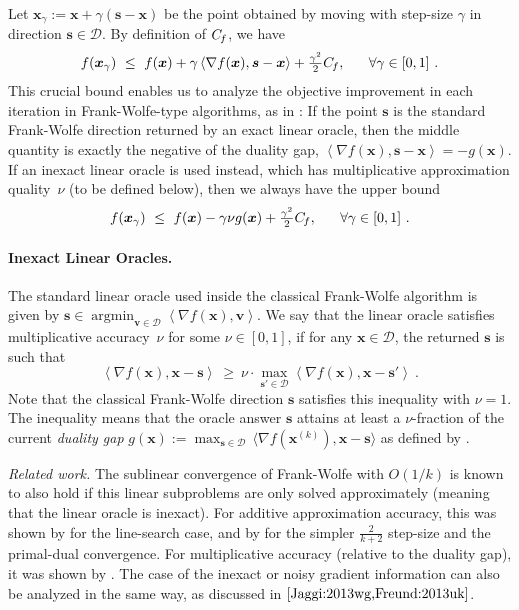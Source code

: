 \documentclass{article} %
\DeclareMathOperator*{\argmin}{\arg\min}
\newcommand{\domain}{\mathcal{D}}
\newcommand{\stepsize}{\gamma}
\newcommand{\Cf}{C_{\hspace{-0.08em}f}}
\newcommand{\x}{\bm{x}}
\newcommand{\s}{\bm{s}}
\newcommand{\vv}{\bm{v}} %
\newcommand{\mapprox}{\nu} %
\newcommand{\0}{\mathbf{0}} %
\begin{document}
Let $\x_\stepsize :=  \x + \stepsize (\s-\x)$ be the point obtained by moving with step-size $\stepsize$ in direction $\s\in\domain$. By definition of $\Cf$, we have
\[\textstyle
%
f(\x_\stepsize) ~\leq~ f(\x) + \stepsize \left\langle  \nabla f(\x), \s-\x \right\rangle + \frac{\stepsize^2}{2} \Cf,~~~~~\forall \stepsize \in [0,1] \ .
\]
This crucial bound enables us to analyze the objective improvement in each iteration in Frank-Wolfe-type algorithms, as in \cite{Jaggi:2013wg}:
If the point $\s$ is the standard Frank-Wolfe direction returned by an exact linear oracle, then the middle quantity is exactly the negative of the duality gap, $\left\langle  \nabla f(\x), \s-\x \right\rangle = -g(\x)$.
If an inexact linear oracle is used instead, which has multiplicative approximation quality~$\mapprox$ (to be defined below), then we always have the upper bound
\begin{equation}\label{eq:CfUpperBound}\textstyle
f(\x_\stepsize) ~\leq~ f(\x) - \stepsize \mapprox g(\x) + \frac{\stepsize^2}{2} \Cf
,~~~~~\forall \stepsize \in [0,1] \ .
\end{equation}


\paragraph{Inexact Linear Oracles.}
The standard linear oracle used inside the classical Frank-Wolfe algorithm is given by $\s \in \argmin_{\vv \in \domain} \left\langle \nabla f(\x), \vv \right\rangle$.
We say that the linear oracle %
satisfies multiplicative accuracy~$\mapprox$ for some $\mapprox\in[0,1]$, if for any $\x\in\domain$, the returned $\s$ is such that
\begin{equation}\label{eq:qualityMult}
\left\langle \nabla f(\x),  \x-\s  \right\rangle
~\ge~
\displaystyle \mapprox\cdot \max_{\s' \in \domain} \textstyle\left\langle \nabla f(\x), \x-\s'  \right\rangle
%
\ .
\end{equation}
Note that the classical Frank-Wolfe direction $\s$ satisfies this inequality with $\mapprox=1$.
The inequality means that the oracle answer $\s$ attains at least a $\mapprox$-fraction of the current \emph{duality gap} $g(\x) := \displaystyle\max_{\s \in \domain} \,\big\langle \nabla f(\x^{(k)}), \x - \s  \big\rangle$ as defined by \cite{Jaggi:2013wg}.
%

\emph{Related work.} The sublinear convergence of Frank-Wolfe with $O(1/k)$ is known to also hold if this linear subproblems are only solved approximately (meaning that the linear oracle is inexact).
For additive approximation accuracy, this was shown by \cite{Dunn:1978di,Dunn:1979da} for the line-search case, and by \cite{Jaggi:2011ux,Jaggi:2013wg} for the simpler $\frac2{k+2}$ step-size and the primal-dual convergence. For multiplicative accuracy (relative to the duality gap), it was shown by \cite[Appendix C]{LacosteJulien:2013ue}.
The case of the inexact or noisy gradient information can also be analyzed in the same way, as discussed in $\cite{Jaggi:2013wg,Freund:2013uk}$.
\end{document}
